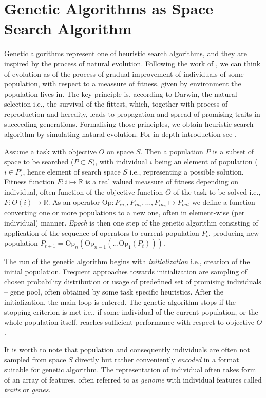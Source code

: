 \section{Genetic Algorithms as Space Search Algorithm}
\label{sec:ga_theory}
Genetic algorithms represent one of heuristic search algorithms, and they are inspired by the process of natural evolution. Following the work of \cite{darwin1859}, we can think of evolution as of the process of gradual improvement of individuals of some population, with respect to a meassure of fitness, given by environment the population lives in. The key principle is, according to Darwin, the natural selection i.e., the survival of the fittest, which, together with process of reproduction and heredity, leads to propagation and spread of promising traits in succeeding generations. Formalising those principles, we obtain heuristic search algorithm by simulating natural evolution. For in depth introduction see \cite{evolution}.

Assume a task with objective $O$ on space $S$. Then a population $P$ is a subset of space to be searched ($P \subset S$), with individual $i$ being an element of population ($i \in P$), hence element of search space $S$ i.e., representing a possible solution. Fitness function $F: i \mapsto \mathbb{R}$ is a real valued meassure of fitness depending on individual, often function of the objective function $O$ of the task to be solved i.e., $F: O(i) \mapsto \mathbb{R}$. As an operator $\text{Op}: P_{in_1}, P_{in_2}, \dots, P_{in_n} \mapsto P_{out}$ we define a function converting one or more populations to a new one, often in element-wise (per individual) manner. \emph{Epoch} is then one step of the genetic algorithm consisting of application of the sequence of operators to current population $P_t$, producing new population $P_{t+1} = \text{Op}_n\left(\text{Op}_{n-1}\left(\dots \text{Op}_1(P_t)\right)\right)$.

The run of the genetic algorithm begins with \emph{initialization} i.e., creation of the initial population. Frequent approaches towards initialization are sampling of chosen probability distribution or usage of predefined set of promising individuals -- gene pool, often obtained by some task specific heuristics. After the initialization, the main loop is entered. The genetic algorithm stops if the stopping criterion is met i.e., if some individual of the current population, or the whole population itself, reaches sufficient performance with respect to objective $O$.

It is worth to note that population and consequently individuals are often not sampled from space $S$ directly but rather conveniently \emph{encoded} in a format suitable for genetic algorithm. The representation of individual often takes form of an array of features, often referred to as \emph{genome} with individual features called \emph{traits} or \emph{genes}.

